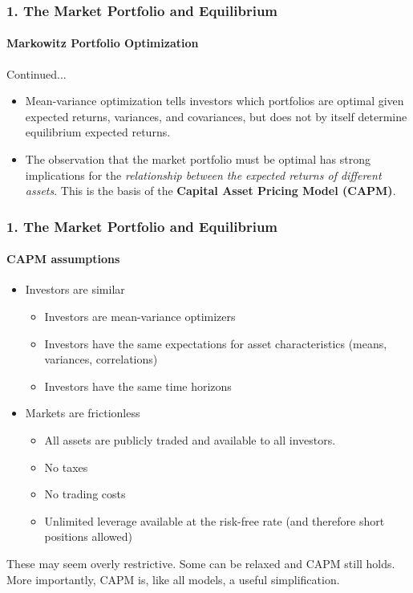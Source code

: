 \documentclass{beamer}
\begin{document}
\begin{frame}[t]
    \frametitle{1. The Market Portfolio and Equilibrium}
    \framesubtitle{Markowitz Portfolio Optimization}

        Continued...

        \begin{itemize}
        \item Mean-variance optimization tells investors which portfolios are
        optimal given expected returns, variances, and covariances, but does not
        by itself determine equilibrium expected returns.
    
        \item The observation that the market portfolio must be optimal has strong implications for the \textit{relationship between the expected returns of different assets}. This is the basis of the \textbf{Capital Asset Pricing Model (CAPM)}.
    \end{itemize}

\end{frame}

\begin{frame}[t]
    \frametitle{1. The Market Portfolio and Equilibrium}
    \framesubtitle{CAPM assumptions}

    \begin{itemize}
    \item Investors are similar
        \begin{itemize} 
            \item Investors are mean-variance optimizers
            \item Investors have the same expectations for asset characteristics (means, variances, correlations)
            \item Investors have the same time horizons
        \end{itemize}
    \item Markets are frictionless
        \begin{itemize} 
            \item All assets are publicly traded and available to all investors.
            \item No taxes
            \item No trading costs
            \item Unlimited leverage available at the risk-free rate
            (and therefore short positions allowed)
        \end{itemize}
    \end{itemize}

    These may seem overly restrictive.   Some can be relaxed and CAPM still holds.  
    More importantly, CAPM is, like all models, a useful simplification.

\end{frame}
\end{document}
